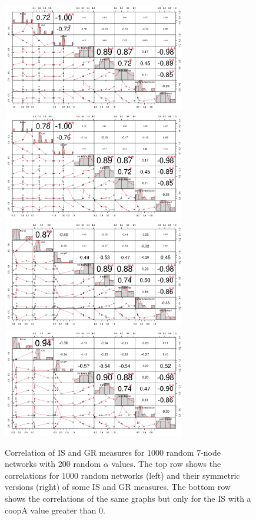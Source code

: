 \documentclass{article}
\begin{document}
\begin{figure}[htbp!]
  \centering{}
  \includegraphics[width=8cm]{img/correlRedes1000}
  \includegraphics[width=8cm]{img/correlRedesS1000}\\
  \includegraphics[width=8cm]{img/correlRedes1000CoopMay0}
  \includegraphics[width=8cm]{img/correlRedesS1000CoopMay0}
  \caption{Correlation of IS and GR measures for 1000 random $7$-node
    networks with 200 random $\alpha$ values. The top row shows the
    correlations for 1000 random networks (left) and their symmetric
    versions (right) of some IS and GR measures. The bottom row shows
    the correlations of the same graphs but only for the IS with a
    coopA value greater than 0.}
  \label{fig:redes1000allAlphas}
\end{figure}
\end{document}
